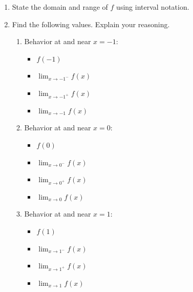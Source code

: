 \documentclass{ximera}
\begin{document}
\begin{example}
\begin{enumerate}

\item  State the domain and range of $f$ using interval notation.


\item  Find the following values. Explain your reasoning.

 
 \begin{enumerate}

 \item Behavior at and near $x = -1$:
 
 \begin{itemize}
 \item $f(-1)$
 
 \item  $\lim_{x \rightarrow -1^{-}} f(x)$
 
  \item  $\lim_{x \rightarrow -1^{+}} f(x)$
 
  \item  $\lim_{x \rightarrow -1} f(x)$
 
 \end{itemize}

\item Behavior at and near $x = 0$:

\begin{itemize} \item $f(0)$
 
 \item  $\lim_{x \rightarrow 0^{-}} f(x)$
 
  \item  $\lim_{x \rightarrow 0^{+}} f(x)$
 
  \item  $\lim_{x \rightarrow 0} f(x)$
\end{itemize}
 
 \item Behavior at and near $x = 1$:
 
 \begin{itemize}\item $f(1)$
 
 \item  $\lim_{x \rightarrow 1^{-}} f(x)$
 
  \item  $\lim_{x \rightarrow 1^{+}} f(x)$
 
   \item  $\lim_{x \rightarrow 1} f(x)$
 
 \end{itemize}
 

\end{enumerate}
\end{enumerate}
\end{example}
\end{document}
